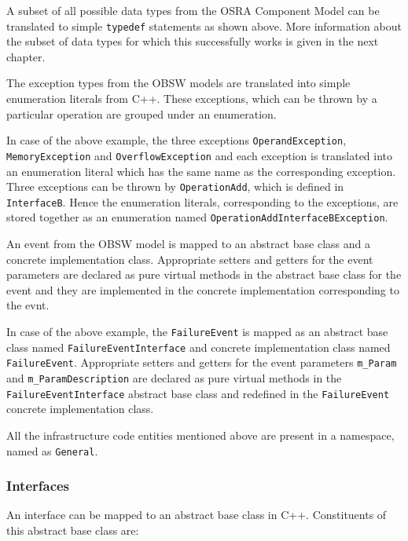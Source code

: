 A subset of all possible data types from the OSRA Component Model can be translated to simple \texttt{typedef} statements as shown above. More information about the subset of data types for which this successfully works is given in the next chapter. 

The exception types from the OBSW models are translated into simple enumeration literals from C++. These exceptions, which can be thrown by a particular operation are grouped under an enumeration.

In case of the above example, the three exceptions \texttt{OperandException}, \texttt{MemoryException} and \texttt{OverflowException} and each exception is translated into an enumeration literal which has the same name as the corresponding exception. Three exceptions can be thrown by \texttt{OperationAdd}, which is defined in \texttt{InterfaceB}. Hence the enumeration literals, corresponding to the exceptions, are stored together as an enumeration named \texttt{OperationAdd\allowbreak InterfaceB\allowbreak Exception}.

An event from the OBSW model is mapped to an abstract base class and a concrete implementation class. Appropriate setters and getters for the event parameters are declared as pure virtual methods in the abstract base class for the event and they are implemented in the concrete implementation corresponding to the evnt.

In case of the above example, the \texttt{FailureEvent} is mapped as an abstract base class named \texttt{FailureEvent\allowbreak Interface} and concrete implementation class named \texttt{FailureEvent}. Appropriate setters and getters for the event parameters \texttt{m\_Param} and \texttt{m\_ParamDescription} are declared as pure virtual methods in the \texttt{FailureEvent\allowbreak Interface} abstract base class and redefined in the \texttt{FailureEvent} concrete implementation class.   

All the infrastructure code entities mentioned above are present in a namespace, named as \texttt{General}.  

\subsubsection{\textbf{Interfaces}}
An interface can be mapped to an abstract base class in C++. Constituents of this abstract base class are:

